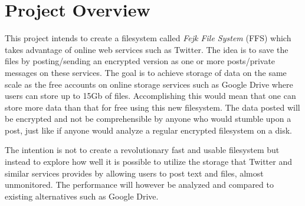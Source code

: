 \section{Project Overview}

This project intends to create a filesystem called \textit{Fejk File System} (FFS) which takes advantage of online web services such as Twitter. The idea is to save the files by posting/sending an encrypted version as one or more posts/private messages on these services. The goal is to achieve storage of data on the same scale as the free accounts on online storage services such as Google Drive where users can store up to 15Gb of files. Accomplishing this would mean that one can store more data than that for free using this new filesystem. The data posted will be encrypted and not be comprehensible by anyone who would stumble upon a post, just like if anyone would analyze a regular encrypted filesystem on a disk. 

The intention is not to create a revolutionary fast and usable filesystem but instead to explore how well it is possible to utilize the storage that Twitter and similar services provides by allowing users to post text and files, almost unmonitored. The performance will however be analyzed and compared to existing alternatives such as Google Drive.
